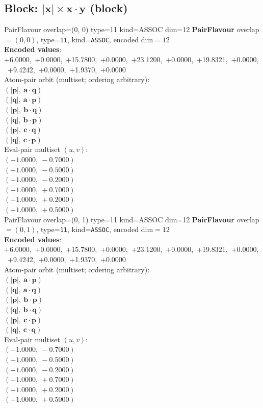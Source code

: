 \documentclass[a4paper,11pt]{article}
\newcommand{\vc}[1]{\ensuremath{\mathbf{#1}}}
\newcommand{\dnfagmiihhiejm}[1]{|\vc{#1}|}
\newcommand{\pdcegfomjfhook}[2]{\mathbf{#1} \cdot \mathbf{#2}}
\begin{document}
\subsection{Block: $\dnfagmiihhiejm{x} \times \pdcegfomjfhook{x}{y}$  (block)}
    PairFlavour  overlap=(0, 0)  type=11  kind=ASSOC  dim=12
\textbf{PairFlavour} overlap$=(0, 0)$, type=\texttt{11}, kind=\texttt{ASSOC}, encoded dim$=12$\\
\textbf{      Encoded values}: +6.0000,\ +0.0000,\ +15.7800,\ +0.0000,\ +23.1200,\ +0.0000,\ +19.8321,\ +0.0000,\ +9.4242,\ +0.0000,\ +1.9370,\ +0.0000\\
\quad Atom-pair orbit (multiset; ordering arbitrary):\\
$(\dnfagmiihhiejm{p},\ \pdcegfomjfhook{a}{q})$\\
$(\dnfagmiihhiejm{q},\ \pdcegfomjfhook{a}{p})$\\
$(\dnfagmiihhiejm{p},\ \pdcegfomjfhook{b}{q})$\\
$(\dnfagmiihhiejm{q},\ \pdcegfomjfhook{b}{p})$\\
$(\dnfagmiihhiejm{p},\ \pdcegfomjfhook{c}{q})$\\
$(\dnfagmiihhiejm{q},\ \pdcegfomjfhook{c}{p})$\\
\quad Eval-pair multiset $(u, v)$:\\
$(+1.0000,\ -0.7000)$\\
$(+1.0000,\ -0.5000)$\\
$(+1.0000,\ -0.2000)$\\
$(+1.0000,\ +0.7000)$\\
$(+1.0000,\ +0.2000)$\\
$(+1.0000,\ +0.5000)$\\
    PairFlavour  overlap=(0, 1)  type=11  kind=ASSOC  dim=12
\textbf{PairFlavour} overlap$=(0, 1)$, type=\texttt{11}, kind=\texttt{ASSOC}, encoded dim$=12$\\
\textbf{      Encoded values}: +6.0000,\ +0.0000,\ +15.7800,\ +0.0000,\ +23.1200,\ +0.0000,\ +19.8321,\ +0.0000,\ +9.4242,\ +0.0000,\ +1.9370,\ +0.0000\\
\quad Atom-pair orbit (multiset; ordering arbitrary):\\
$(\dnfagmiihhiejm{p},\ \pdcegfomjfhook{a}{p})$\\
$(\dnfagmiihhiejm{q},\ \pdcegfomjfhook{a}{q})$\\
$(\dnfagmiihhiejm{p},\ \pdcegfomjfhook{b}{p})$\\
$(\dnfagmiihhiejm{q},\ \pdcegfomjfhook{b}{q})$\\
$(\dnfagmiihhiejm{p},\ \pdcegfomjfhook{c}{p})$\\
$(\dnfagmiihhiejm{q},\ \pdcegfomjfhook{c}{q})$\\
\quad Eval-pair multiset $(u, v)$:\\
$(+1.0000,\ -0.7000)$\\
$(+1.0000,\ -0.5000)$\\
$(+1.0000,\ -0.2000)$\\
$(+1.0000,\ +0.7000)$\\
$(+1.0000,\ +0.2000)$\\
$(+1.0000,\ +0.5000)$\\
\end{document}
